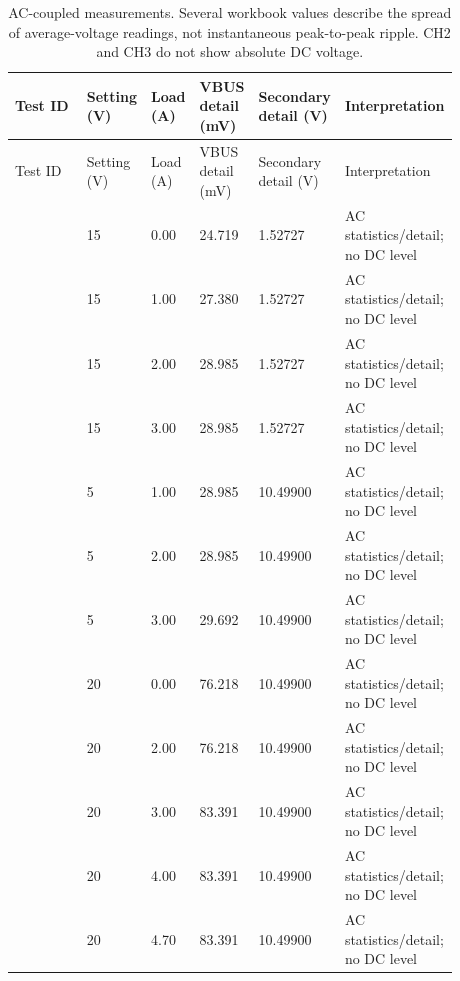\begingroup
\scriptsize
\setlength{\tabcolsep}{3pt}
\renewcommand{\arraystretch}{1.12}
\begin{longtable}{@{}L{0.2872\linewidth} L{0.0741\linewidth} L{0.0741\linewidth} L{0.1297\linewidth} L{0.1297\linewidth} L{0.1853\linewidth}@{}}
\caption{AC-coupled measurements. Several workbook values describe the spread of average-voltage readings, not instantaneous peak-to-peak ripple. CH2 and CH3 do not show absolute DC voltage.}\label{tab:ac-coupled-ripple-captures-complete}\\
\toprule
Test ID & Setting (V) & Load (A) & VBUS detail (mV) & Secondary detail (V) & Interpretation\\
\midrule
\endfirsthead
\toprule
Test ID & Setting (V) & Load (A) & VBUS detail (mV) & Secondary detail (V) & Interpretation\\
\midrule
\endhead
{} & 15 & 0.00 & 24.719 & 1.52727 & AC statistics/detail; no DC level\\
 & 15 & 1.00 & 27.380 & 1.52727 & AC statistics/detail; no DC level\\
 & 15 & 2.00 & 28.985 & 1.52727 & AC statistics/detail; no DC level\\
 & 15 & 3.00 & 28.985 & 1.52727 & AC statistics/detail; no DC level\\
 & 5 & 1.00 & 28.985 & 10.49900 & AC statistics/detail; no DC level\\
 & 5 & 2.00 & 28.985 & 10.49900 & AC statistics/detail; no DC level\\
 & 5 & 3.00 & 29.692 & 10.49900 & AC statistics/detail; no DC level\\
 & 20 & 0.00 & 76.218 & 10.49900 & AC statistics/detail; no DC level\\
 & 20 & 2.00 & 76.218 & 10.49900 & AC statistics/detail; no DC level\\
 & 20 & 3.00 & 83.391 & 10.49900 & AC statistics/detail; no DC level\\
 & 20 & 4.00 & 83.391 & 10.49900 & AC statistics/detail; no DC level\\
 & 20 & 4.70 & 83.391 & 10.49900 & AC statistics/detail; no DC level\\
\bottomrule
\end{longtable}
\endgroup
